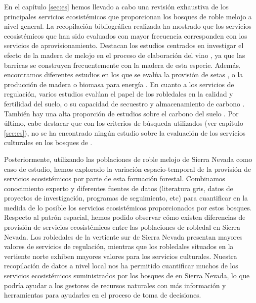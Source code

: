 En el capítulo \ref{sec:es} hemos llevado a cabo una revisión exhaustiva de los principales servicios ecosistémicos que proporcionan los bosques de roble melojo a nivel general. La recopilación bibliográfica realizada ha mostrado que los servicios ecosistémicos que han sido evaluados con mayor frecuencia corresponden con los servicios de aprovisionamiento. Destacan los estudios centrados en investigar el efecto de la madera de melojo en el proceso de elaboración del vino \autocites[\emph{e.g.}][]{FernandezdeSimonetal2010CharacterizationVolatile,CastroVazquezetal2013EvaluationPortuguese}, ya que las barricas se construyen frecuentemente con la madera de esta especie. Además, encontramos diferentes estudios en los que se evalúa la provisión de setas \autocites[\emph{e.g.}][]{OriadeRuedaetal2010CouldArtificial}, o la producción de madera o biomasa para energía  \autocites[\emph{e.g.}][]{Mirandaetal2009EnergeticCharacterization}. En cuanto a los servicios de regulación, varios estudios evalúan el papel de los robledales en la calidad y fertilidad del suelo, o su capacidad de secuestro y almacenamiento de carbono \autocites[\emph{e.g.}][]{Alvarezetal2014InfluenceTree}. También hay una alta proporción de estudios sobre el carbono del suelo \autocites[\emph{e.g.}][]{Fonsecaetal2019ImpactTree}. Por último, cabe destacar que con los criterios de búsqueda utilizados (ver capítulo \ref{sec:es}), no se ha encontrado ningún estudio sobre la evaluación de los servicios culturales en los bosques de \Qpy.

Posteriormente, utilizando las poblaciones de roble melojo de Sierra Nevada como caso de estudio, hemos explorado la variación espacio-temporal de la provisión de servicios ecosistémicos por parte de esta formación forestal. Combinamos conocimiento experto y diferentes fuentes de datos (literatura gris, datos de proyectos de investigación,  programas de seguimiento, etc) para cuantificar en la medida de lo posible los servicios ecosistémicos proporcionados por estos bosques. Respecto al patrón espacial, hemos podido observar cómo existen diferencias de provisión de servicios ecosistémicos entre las poblaciones de robledal en Sierra Nevada. Los robledales de la vertiente sur de Sierra Nevada presentan mayores valores de servicios de regulación, mientras que los robledales situados en la vertiente norte exhiben mayores valores para los servicios culturales. Nuestra recopilación de datos a nivel local nos ha permitido cuantificar muchos de los servicios ecosistémicos suministrados por los bosques de \Qp en Sierra Nevada, lo que podría ayudar a los gestores de recursos naturales con más información y herramientas para ayudarles en el proceso de toma de decisiones.

